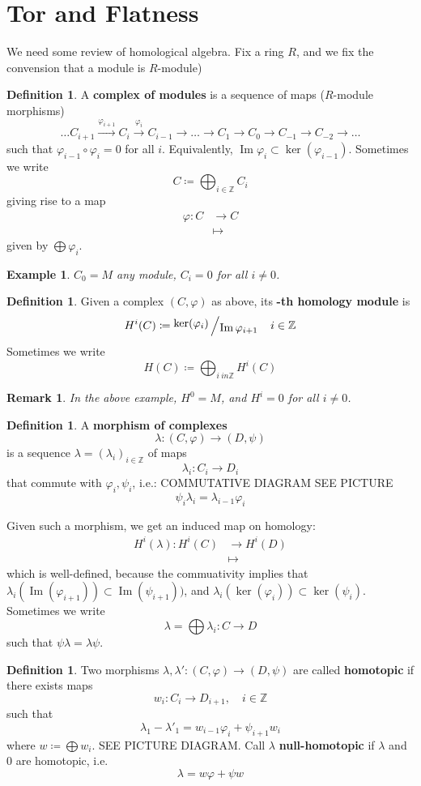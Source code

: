 \documentclass[12pt]{article}
\newcommand{\z}{\mathbb{Z}}
\DeclareMathOperator{\Im}{Im}
\newcommand{\bigslant}[2]{{\raisebox{.2em}{$#1$}\left/\raisebox{-.2em}{$#2$}\right.}}
\newcommand{\mapping}[5]{\begin{align*}
#1\colon #2 &\to #3\\
#4 & \mapsto #5
\end{align*}}
\newtheorem{remark}[theorem]{Remark}
\newtheorem*{eg}{Example}
\theoremstyle{definition}
\newtheorem{definition}[theorem]{Definition}
\begin{document}
\section*{Tor and Flatness}
We need some review of homological algebra. Fix a ring $R$, and we fix the convension that a module  is $R$-module)
\begin{definition}
A \textbf{complex of modules} is a sequence of maps ($R$-module morphisms)
\[
\dots C_{i+1} \xrightarrow{\varphi_{i+1}} C_i \xrightarrow{\varphi_{i} } C_{i-1}\rightarrow \dots \rightarrow C_1\rightarrow C_0 \rightarrow C_{-1} \rightarrow C_{-2} \rightarrow \dots
\]
such that $\varphi_{i-1} \circ \varphi_i = 0$ for all $i$. Equivalently, $\Im{\varphi_i} \subset \ker (\varphi_{i-1})$. Sometimes we write 
\[
C \coloneqq \bigoplus_{i\in \z} C_i
\]
giving rise to a map
\[
\mapping{\varphi}{C}{C}{}{}
\]
given by $\bigoplus \varphi_i$.
\end{definition}
\begin{eg}
$C_0 = M$ any module, $C_i = 0 $ for all $i\neq 0$.
\end{eg}
\begin{definition}
Given a complex $(C,\varphi)$ as above, its \textbf{-th homology module} is 
\[
H^i(C) \coloneqq \bigslant{\ker(\varphi_i)}{\Im{\varphi_{i+1}} } \quad i\in \z
\]
Sometimes we write
\[
H(C) \coloneqq \bigoplus_{i\ in \z} H^i(C)
\]
\end{definition}
\begin{remark}
In the above example, $H^0= M$, and $H^i = 0 $ for all $i\neq 0$. 
\end{remark}
\begin{definition}
A \textbf{morphism of complexes}
\[
\lambda: (C,\varphi) \rightarrow (D,\psi)
\]
is a sequence $\lambda = (\lambda_i)_{i\in \z}$ of maps 
\[
\lambda_i : C_i \rightarrow D_i
\]
that commute with $\varphi_i,\psi_i$, i.e.:
COMMUTATIVE DIAGRAM SEE PICTURE
\[
\psi_i \lambda_i = \lambda_{i-1}\varphi_i
\]

\end{definition}
Given such a morphism, we get an induced map on homology:
\[
\mapping{H^i(\lambda)}{H^i(C)}{H^i(D)}{}{}
\]
which is well-defined, because the commuativity implies that $\lambda_i(\Im(\varphi_{i+1})) \subset \Im(\psi_{i+1}))$, and $\lambda_i(\ker(\varphi_{i})) \subset \ker(\psi_i)$.\\
Sometimes we write
\[
\lambda = \bigoplus \lambda_i : C\rightarrow D
\]
such that $\psi \lambda = \lambda \psi$.
\begin{definition}
Two morphisms $\lambda, \lambda': (C,\varphi)\rightarrow (D,\psi)$ are called \textbf{homotopic} if there exists maps
\[
w_i: C_i \rightarrow D_{i+1}, \quad i\in \z
\]
such that 
\[
\lambda_1 - \lambda'_1 = w_{i-1}\varphi_i+ \psi_{i+1} w_i
\]
where $w \coloneqq \bigoplus w_i$. SEE PICTURE DIAGRAM. Call $\lambda$ \textbf{null-homotopic} if $\lambda$ and $0$ are homotopic, i.e.
\[
\lambda = w \varphi + \psi w
\]
\end{definition}
\end{document}
